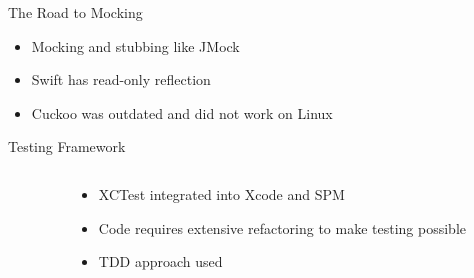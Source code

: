 \documentclass[aspectratio=169]{beamer}
\begin{document}
\begin{frame}{The Road to Mocking}
\begin{center}
    \begin{itemize}
        \item Mocking and stubbing like JMock
        \item Swift has read-only reflection
        \item Cuckoo was outdated and did not work on Linux
    \end{itemize}
\end{center}
\end{frame}

\begin{frame}{Testing Framework}
\begin{columns}
    \begin{column}{0.4\textwidth}
        \inputminted[fontsize=\tiny]{swift}{code/unit-test.flint}
    \end{column}
    \begin{column}{0.6\textwidth}
        \begin{itemize}
            \item XCTest integrated into Xcode and SPM
            \item Code requires extensive refactoring to make testing possible
            \item TDD approach used
        \end{itemize}
    \end{column}
\end{columns}
\end{frame}
\end{document}
